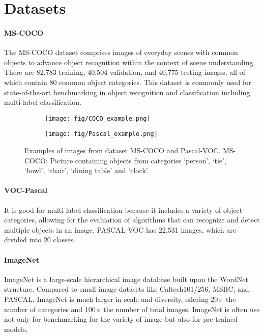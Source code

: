 \section{Datasets}\label{datasets}
\paragraph{MS-COCO}\cite{linMicrosoftCOCOCommon2015}
The MS-COCO dataset comprises images of everyday scenes with common objects to advance object 
recognition within the context of scene understanding. 
There are 82,783 training, 40,504 validation, and 40,775 testing images, 
all of which contain 80 common object categories. 
This dataset is commonly used for state-of-the-art benchmarking in object recognition and 
classification including multi-label classification.

\begin{figure}[h!]
\centering
\begin{subfigure}[b]{0.4\linewidth}
    \texttt{[image: fig/COCO\_example.png]}
\end{subfigure}
\begin{subfigure}[b]{0.4\linewidth}
    \texttt{[image: fig/Pascal\_example.png]}
\end{subfigure}
\caption{Examples of images from dataset MS-COCO and Pascal-VOC. MS-COCO: Picture containing objects from categories `person', `tie', `bowl', `chair', `dining table' and `clock'.}
\label{fig:coco_pascal}
\end{figure}

\paragraph{VOC-Pascal}\cite{everinghamPascalVisualObject2015}
It is good for multi-label classification because it includes a variety of object categories, allowing for the evaluation of algorithms that can recognize and detect multiple objects in an image. 
PASCAL-VOC has 22,531 images, which are divided into 20 classes.

\paragraph{ImageNet}\cite{dengImageNetLargescaleHierarchical2009}
ImageNet is a large-scale hierarchical image database built upon the WordNet structure. 
Compared to small image datasets like Caltech101/256, MSRC, and PASCAL, ImageNet is much larger in scale and diversity, 
offering 20× the number of categories and 100× the number of total images.
ImageNet is often use not only for benchmarking for the variety of image but also for pre-trained models.


